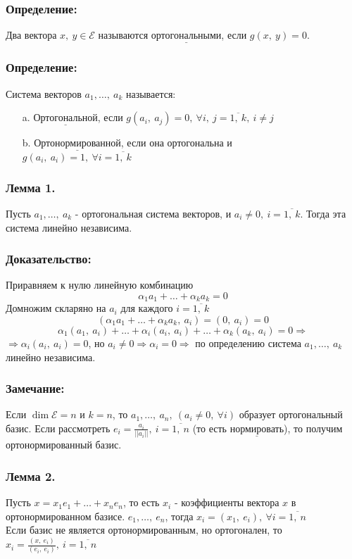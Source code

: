 \documentclass[12pt, letterpaper, twoside]{article}
\newcommand{\Underl}[1]{$\underline{\text{#1}}$}
\begin{document}
    \subsubsection*{Определение:}
    Два вектора $x,\ y\in \mathcal{E}$ называются \Underl{ортогональными}, если $g(x,\ y) = 0$.
    \subsubsection*{Определение:}
    Система векторов $a_1,\dots,\ a_k$ называется:
    \begin{enumerate}
        \item[a.] \Underl{Ортогональной}, если $g(a_i,\ a_j) = 0,\ \forall i,\ j = \overline{1,\ k},\ i\neq j$
        \item[b.] \Underl{Ортонормированной}, если она ортогональна и\\
        $g(a_i,\ a_i) = 1,\ \forall i = \overline{1,\ k}$ 
    \end{enumerate}
    \subsubsection*{Лемма 1.}
    Пусть $a_1,\dots,\ a_k$ - ортогональная система векторов, и $a_i\neq 0,\ i = \overline{1,\ k}$. Тогда эта система линейно независима.
    \subsubsection*{Доказательство:}
    Приравняем к нулю линейную комбинацию
    \[\alpha_1 a_1 + \dots + \alpha_k a_k = 0\]
    Домножим скларяно на $a_i$ для каждого $i = \overline{1,\ k}$
    \[(\alpha_1 a_1 + \dots + \alpha_k a_k,\ a_i) = (0,\ a_i) = 0\]
    \[\alpha_1 (a_1,\ a_i) + \dots + \alpha_i (a_i,\ a_i) + \dots + \alpha_k(a_k,\ a_i) = 0\Rightarrow\]
    $\Rightarrow \alpha_i(a_i,\ a_i) = 0$, но $a_i\neq 0\Rightarrow \alpha_i = 0\Rightarrow$ по определению система $a_1,\dots,\ a_k$ линейно независима.
    \subsubsection*{Замечание:}
    Если $\dim \mathcal{E} = n$ и $k = n$, то $a_1,\dots,\ a_n,\ (a_i\neq 0,\ \forall i)$ образует ортогональный базис. Если рассмотреть $e_i = \frac{a_i}{||a_i||},\ i = \overline{1,\ n}$ (то есть \Underl{нормировать}), то получим ортонормированный базис.
    \subsubsection*{Лемма 2.}
    Пусть $x = x_1 e_1 + \dots + x_n e_n$, то есть $x_i$ - коэффициенты вектора $x$ в ортонормированном базисе. $e_1,\dots,\ e_n$, тогда $x_i = (x_1,\ e_i),\ \forall i = \overline{1,\ n}$\\
    Если базис не является ортонормированным, но ортогонален, то $x_i = \frac{(x,\ e_i)}{(e_i,\ e_i)},\ i = \overline{1,\ n}$
\end{document}
